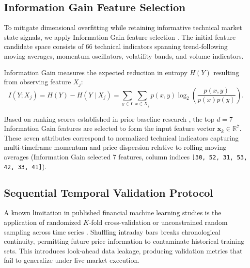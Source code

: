 \subsection{Information Gain Feature Selection}\label{sec:data_features}

To mitigate dimensional overfitting while retaining informative technical market state signals, we apply Information Gain feature selection \cite{souza2025iccsa}. The initial feature candidate space consists of 66 technical indicators spanning trend-following moving averages, momentum oscillators, volatility bands, and volume indicators.

Information Gain measures the expected reduction in entropy $H(Y)$ resulting from observing feature $X_j$:
\begin{equation}\label{eq:infogain}
    I(Y; X_j) = H(Y) - H(Y \mid X_j) = \sum_{y \in Y} \sum_{x \in X_j} p(x, y) \log_2 \left( \frac{p(x, y)}{p(x) p(y)} \right).
\end{equation}

Based on ranking scores established in prior baseline research \cite{souza2025iccsa}, the top $d=7$ Information Gain features are selected to form the input feature vector $\bm{x}_k \in \mathbb{R}^7$. These seven attributes correspond to normalized technical indicators capturing multi-timeframe momentum and price dispersion relative to rolling moving averages (Information Gain selected 7 features, column indices \texttt{[30, 52, 31, 53, 42, 33, 41]}).

\subsection{Sequential Temporal Validation Protocol}\label{sec:data_split}

A known limitation in published financial machine learning studies is the application of randomized $K$-fold cross-validation or unconstrained random sampling across time series \cite{souza2026ijcnn, makridakis2018statistical}. Shuffling intraday bars breaks chronological continuity, permitting future price information to contaminate historical training sets. This introduces look-ahead data leakage, producing validation metrics that fail to generalize under live market execution.

